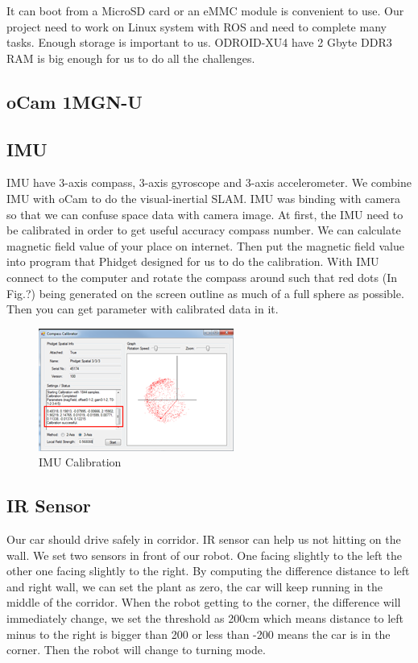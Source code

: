 \documentclass[a4paper, 10pt, conference]{ieeeconf}      %
\begin{document}
It can boot from a MicroSD card or an eMMC module is convenient to use. Our project need to work on Linux system with ROS and need to complete many tasks. Enough storage is important to us. ODROID-XU4 have 2 Gbyte DDR3 RAM is big enough for us to do all the challenges.

\subsection{oCam 1MGN-U}

\subsection{IMU}
IMU have 3-axis compass, 3-axis gyroscope and 3-axis accelerometer. We combine IMU with oCam to do the visual-inertial SLAM. IMU was binding with camera so that we can confuse space data with camera image.
At first, the IMU need to be calibrated in order to get useful accuracy compass number. We can calculate magnetic field value of your place on internet. Then put the magnetic field value into program that Phidget designed for us to do the calibration. With IMU connect to the computer and rotate the compass around such that red dots (In Fig.?) being generated on the screen outline as much of a full sphere as possible. Then you can get parameter with calibrated data in it.

\begin{figure}
    \centering
    \includegraphics{IMU.png}
    \caption{IMU Calibration}
    \label{imu cali}
\end{figure}

\subsection{IR Sensor}
Our car should drive safely in corridor. IR sensor can help us not hitting on the wall. We set two sensors in front of our robot. One facing slightly to the left the other one facing slightly to the right. By computing the difference distance to left and right wall, we can set the plant as zero, the car will keep running in the middle of the corridor. When the robot getting to the corner, the difference will immediately change, we set the threshold as 200cm which means distance to left minus to the right is bigger than 200 or less than -200 means the car is in the corner. Then the robot will change to turning mode.
\end{document}
